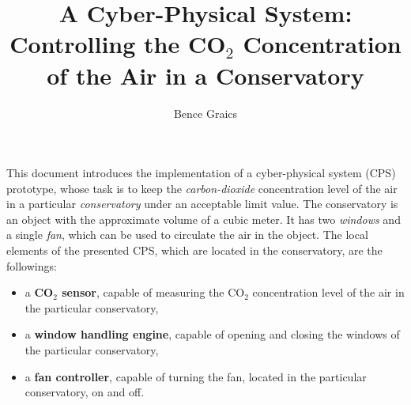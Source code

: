 \documentclass[a4paper, 11pt]{article}
\begin{document}
	
	\newcommand{\specialcell}[2][c]{%
		\begin{tabular}[#1]{@{}c@{}}#2\end{tabular}}
	
	\newenvironment*{mytable}[3]{
		\begin{table}[htbp]	
			\caption{#1}          
			\label{tab:#2}            
			\center%
			\begin{tabular}{#3}
			}
			{
			\end{tabular}
		\end{table}
	}
	
	\pagestyle{plain}
	
	
	
	\nonfrenchspacing
	\setlength{\parindent}{0em}
	\setlength{\parskip}{0.45em}
	
	\title{A Cyber-Physical System:\\Controlling the CO$_2$ Concentration of the Air in a Conservatory}
	\date{}
	\author{Bence Graics}	
	
	\maketitle
	\tableofcontents
	\newpage
	
	This document introduces the implementation of a cyber-physical system (CPS) prototype, whose task is to keep the \emph{carbon-dioxide} concentration level of the air in a particular \emph{conservatory} under an acceptable limit value.
	The conservatory is an object with the approximate volume of a cubic meter. It has two \emph{windows} and a single \emph{fan}, which can be used to circulate the air in the object. The local elements of the presented CPS, which are located in the conservatory, are the followings:
	\begin{itemize}
		\item a \textbf{CO$_2$ sensor}, capable of measuring the CO$_2$ concentration level of the air in the particular conservatory,
		\item a \textbf{window handling engine}, capable of opening and closing the windows of the particular conservatory,
		\item a \textbf{fan controller}, capable of turning the fan, located in the particular conservatory, on and off.
	\end{itemize}
	
\end{document}
